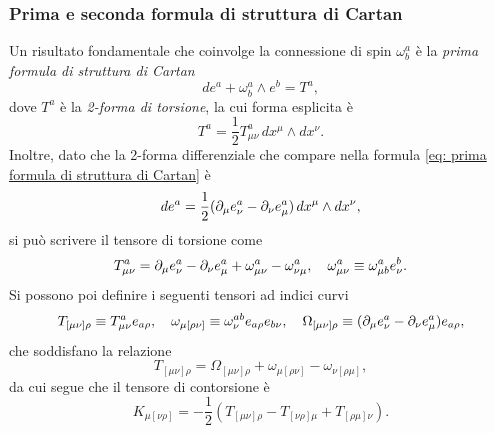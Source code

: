 \subsubsection{Prima e seconda formula di struttura di Cartan}
Un risultato fondamentale che coinvolge la connessione di spin $\omega^a_b$ è la \emph{prima formula di struttura di Cartan}
\begin{equation}
\label{eq: prima formula di struttura di Cartan}
    de^a + \omega^a_b \wedge e^b = T^a,
\end{equation}
dove $T^a$ è la \emph{2-forma di torsione}, la cui forma esplicita è
\begin{equation}
    T^a = \frac{1}{2}T^a_{\mu\nu}\,dx^\mu \wedge dx^\nu.
\end{equation}
Inoltre, dato che la 2-forma differenziale che compare nella formula \eqref{eq: prima formula di struttura di Cartan} è
\begin{equation}
    de^a = \frac{1}{2}(\partial_\mu e^a_\nu - \partial_\nu e^a_\mu)\,dx^\mu \wedge dx^\nu,
\end{equation}
si può scrivere il tensore di torsione come 
\begin{equation}
    T^a_{\mu\nu} = \partial_\mu e^a_\nu - \partial_\nu e^a_\mu + \omega^a_{\mu\nu} - \omega^a_{\nu\mu},\quad \omega^a_{\mu\nu} \equiv \omega^a_{\mu b}e^b_\nu.
\end{equation}
Si possono poi definire i seguenti tensori ad indici curvi
\begin{equation}
    T_{[\mu\nu]\rho} \equiv T^a_{\mu\nu}e_{a\rho},\quad \omega_{\mu[\rho\nu]} \equiv \omega^{ab}_\nu e_{a\rho}e_{b\nu},\quad \Omega_{[\mu\nu]\rho} \equiv (\partial_\mu e^a_\nu - \partial_\nu e^a_\mu)e_{a\rho},
\end{equation}
che soddisfano la relazione 
\begin{equation}
    T_{[\mu\nu]\rho} = \Omega_{[\mu\nu]\rho} + \omega_{\mu[\rho\nu]} - \omega_{\nu[\rho\mu]},
\end{equation}
da cui segue che il tensore di contorsione è
\begin{equation}
    K_{\mu[\nu\rho]} = -\frac{1}{2}(T_{[\mu\nu]\rho} - T_{[\nu\rho]\mu} + T_{[\rho\mu]\nu}).
\end{equation}

